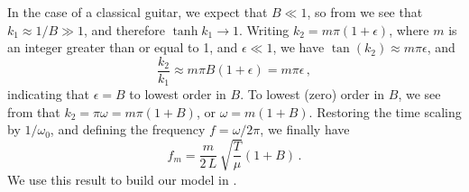 In the case of a classical guitar, we expect that $B \ll 1$, so from  we see that $k_1 \approx 1/B \gg 1$, and therefore $\tanh{k_1} \longrightarrow 1$. Writing $k_2 = m \pi (1 + \epsilon)$, where $m$ is an integer greater than or equal to 1, and $\epsilon \ll 1$, we have $\tan(k_2) \approx m \pi \epsilon$, and
 \begin{equation}
\frac{k_2}{k_1} \approx m \pi B (1 + \epsilon) = m \pi \epsilon\, ,
 \end{equation}
indicating that $\epsilon = B$ to lowest order in $B$. To lowest (zero) order in $B$, we see from  that $k_2 = \pi \omega = m \pi (1 + B)$, or $\omega = m (1 + B)$. Restoring the time scaling by $1/\omega_0$, and defining the frequency $f = \omega/2 \pi$, we finally have
 \begin{equation} \label{eqn:f_m_stiff}
f_m = \frac{m}{2\, L}\, \sqrt{\frac{T}{\mu}} (1 + B)\, .
 \end{equation}
We use this result to build our model in .